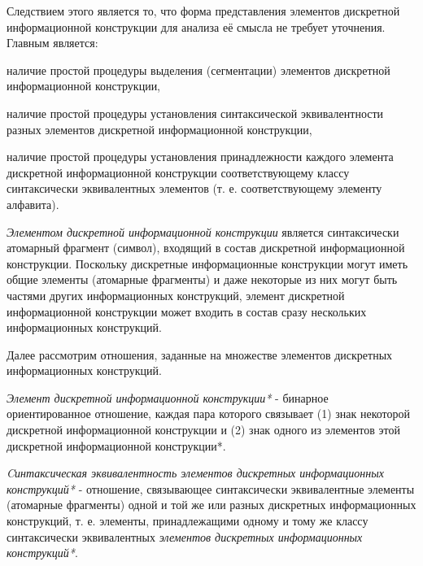 Следствием этого является то, что форма представления элементов дискретной информационной конструкции для анализа её смысла не требует уточнения.
Главным является:
\begin{textitemize}
    \item наличие простой процедуры выделения (сегментации) элементов дискретной информационной конструкции,
    \item наличие простой процедуры установления синтаксической эквивалентности разных элементов дискретной информационной конструкции,
    \item наличие простой процедуры установления принадлежности каждого элемента дискретной информационной конструкции соответствующему классу синтаксически эквивалентных элементов (т. е. соответствующему элементу алфавита).
\end{textitemize}

\textit{Элементом дискретной информационной конструкции} является синтаксически атомарный фрагмент (символ), входящий в состав дискретной информационной конструкции.
Поскольку дискретные информационные конструкции могут иметь общие элементы (атомарные фрагменты) и даже некоторые из них могут быть частями других информационных конструкций, элемент дискретной информационной конструкции может входить в состав сразу нескольких информационных конструкций.

Далее рассмотрим отношения, заданные на множестве элементов дискретных информационных конструкций.

\begin{SCn}


\end{SCn}

\textit{Элемент дискретной информационной конструкции*} - бинарное ориентированное отношение, каждая пара которого связывает (1) знак некоторой дискретной информационной конструкции и (2) знак одного из элементов этой дискретной информационной конструкции*.

\textit{Cинтаксическая эквивалентность элементов дискретных информационных конструкций*} - отношение, связывающее синтаксически эквивалентные элементы (атомарные фрагменты) одной и той же или разных дискретных информационных конструкций, т. е. элементы, принадлежащими одному и тому же классу синтаксически эквивалентных \textit{элементов дискретных информационных конструкций*}.

